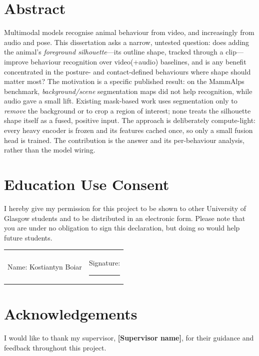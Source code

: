 \documentclass[12pt,a4paper]{report}
\begin{document}
\chapter*{Abstract}
Multimodal models recognise animal behaviour from video, and increasingly from audio and
pose. This dissertation asks a narrow, untested question: does adding the animal's
\emph{foreground silhouette}---its outline shape, tracked through a clip---improve
behaviour recognition over video(+audio) baselines, and is any benefit concentrated in the
posture- and contact-defined behaviours where shape should matter most? The motivation is a
specific published result: on the MammAlps benchmark, \emph{background/scene} segmentation
maps did not help recognition, while audio gave a small lift. Existing mask-based work uses
segmentation only to \emph{remove} the background or to crop a region of interest; none
treats the silhouette shape itself as a fused, positive input. The approach is deliberately
compute-light: every heavy encoder is frozen and its features cached once, so only a small
fusion head is trained. The contribution is the answer and its per-behaviour analysis,
rather than the model wiring.

\chapter*{Education Use Consent}
\noindent I hereby give my permission for this project to be shown to other University of
Glasgow students and to be distributed in an electronic form. Please note that you are under
no obligation to sign this declaration, but doing so would help future students.

\vspace{1.5cm}
\noindent\begin{tabular}{@{}p{}p{}@{}}
Name: Kostiantyn Boiar & Signature: \rule{4cm}{0.4pt}
\end{tabular}

\chapter*{Acknowledgements}
I would like to thank my supervisor, \textbf{[Supervisor name]}, for their guidance and
feedback throughout this project. %
\end{document}
